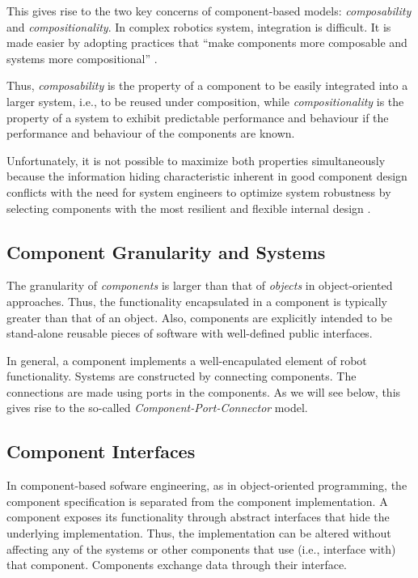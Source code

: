 \documentclass{CSSRforAfrica}
\begin{document}
This gives rise to the two key concerns of component-based models: {\em composability} and {\em compositionality}.  In complex robotics system, integration is difficult.  It is made easier by adopting practices that ``make components more composable and systems more compositional'' \cite{Bruyninckx10}.
	
Thus, {\em composability} is the property of a component to be easily integrated into a larger system, i.e., to be reused under composition, while {\em compositionality} is the property of a system to exhibit predictable performance and behaviour if the performance and behaviour of the components are known.  

Unfortunately, it is not possible to maximize both properties simultaneously because the information hiding characteristic inherent in good component design conflicts with the need for system engineers to optimize system robustness by selecting components with the most resilient and flexible internal design \cite{Bruyninckx10}.


\subsection{Component Granularity and Systems}

The granularity of {\em components} is larger than that of {\em objects} in object-oriented approaches. Thus, the functionality encapsulated in a component is typically greater than that of an object. Also, components are explicitly intended to be stand-alone reusable pieces of software with well-defined public interfaces.

In general, a component implements a well-encapulated element of robot functionality.  Systems are constructed by connecting components. The connections are made using ports in the components.  As we will see below, this gives rise to the so-called {\em Component-Port-Connector} model.  


\subsection{Component Interfaces}

In component-based sofware engineering, as in object-oriented programming, the component specification is separated from the component implementation.  A component exposes its functionality through abstract interfaces that hide the underlying implementation.  Thus, the implementation can be altered without affecting any of the systems or other components that use (i.e., interface with) that component.  Components exchange data through their interface.
\end{document}
